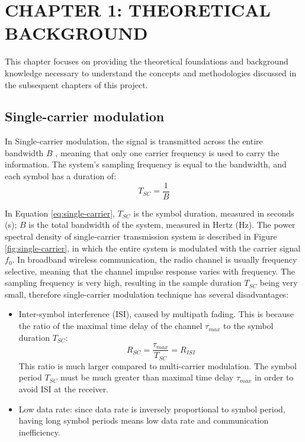 \section*{CHAPTER 1: THEORETICAL BACKGROUND}
\setcounter{section}{1}
\setcounter{subsection}{0}
\setcounter{figure}{0}
\setcounter{table}{0}

This chapter focuses on providing the theoretical foundations and background knowledge necessary to understand the concepts and methodologies discussed in the subsequent chapters of this project.

\subsection{Single-carrier modulation}
In Single-carrier modulation, the signal is transmitted across the entire bandwidth $B$ \cite{OFDM2006}, meaning that only one carrier frequency is used to carry the information. The system's sampling frequency is equal to the bandwidth, and each symbol has a duration of:
\begin{equation}
    T_{SC} = \frac{1}{B}
    \label{eq:single-carrier}
\end{equation}

In Equation \ref{eq:single-carrier}, $T_{SC}$ is the symbol duration, measured in seconds (s); $B$ is the total bandwidth of the system, measured in Hertz (Hz). The power spectral density of single-carrier transmission system is described in Figure \ref{fig:single-carrier}, in which the entire system is modulated with the carrier signal $f_0$. In broadband wireless communication, the radio channel is usually frequency selective, meaning that the channel impulse response varies with frequency. The sampling frequency is very high, resulting in the sample duration $T_{SC}$ being very small, therefore single-carrier modulation technique has several disadvantages:

\begin{itemize}
    \item Inter-symbol interference (ISI), caused by multipath fading. This is because the ratio of the maximal time delay of the channel $\tau_{max}$ to the symbol duration $T_{SC}$:
    \begin{equation}
        R_{SC} = \frac{\tau_{max}}{T_{SC}} = R_{ISI}
    \end{equation}
    This ratio is much larger compared to multi-carrier modulation. The symbol period $T_{SC}$ must be much greater than maximal time delay $\tau_{max}$ in order to avoid ISI at the receiver.
    \item Low data rate: since data rate is inversely proportional to symbol period, having long symbol periods means low data rate and communication inefficiency.
\end{itemize}

